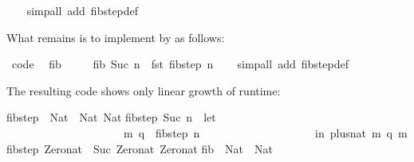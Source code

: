 \begin{isabellebody}
\ \ \isamarkupfalse%
\ {\isacharparenleft}simp{\isacharunderscore}all\ add{\isacharcolon}\ fib{\isacharunderscore}step{\isacharunderscore}def{\isacharparenright}%
\endisatagquote
{\isafoldquote}%
%
\isadelimquote
%
\endisadelimquote
%
\begin{isamarkuptext}%
\noindent What remains is to implement  by  as follows:%
\end{isamarkuptext}%
\isamarkuptrue%
%
\isadelimquote
%
\endisadelimquote
%
\isatagquote
{}\isamarkupfalse%
\ {\isacharbrackleft}code{\isacharbrackright}{\isacharcolon}\isanewline
\ \ {\isachardoublequoteopen}fib\ {}\ {\isacharequal}\ {}{\isachardoublequoteclose}\isanewline
\ \ {\isachardoublequoteopen}fib\ {\isacharparenleft}Suc\ n{\isacharparenright}\ {\isacharequal}\ fst\ {\isacharparenleft}fib{\isacharunderscore}step\ n{\isacharparenright}{\isachardoublequoteclose}\isanewline
\ \ \isamarkupfalse%
\ {\isacharparenleft}simp{\isacharunderscore}all\ add{\isacharcolon}\ fib{\isacharunderscore}step{\isacharunderscore}def{\isacharparenright}%
\endisatagquote
{\isafoldquote}%
%
\isadelimquote
%
\endisadelimquote
%
\begin{isamarkuptext}%
\noindent The resulting code shows only linear growth of runtime:%
\end{isamarkuptext}%
\isamarkuptrue%
%
\isadelimquote
%
\endisadelimquote
%
\isatagquote
%
\begin{isamarkuptext}%
\begin{typewriter}
    fib{\isacharunderscore}step\ {\isacharcolon}{\isacharcolon}\ Nat\ {\isacharminus}{\isachargreater}\ {\isacharparenleft}Nat{\isacharcomma}\ Nat{\isacharparenright}{\isacharsemicolon}\isanewline
fib{\isacharunderscore}step\ {\isacharparenleft}Suc\ n{\isacharparenright}\ {\isacharequal}\ let\ {\isacharbraceleft}\isanewline
\ \ \ \ \ \ \ \ \ \ \ \ \ \ \ \ \ \ \ \ \ {\isacharparenleft}m{\isacharcomma}\ q{\isacharparenright}\ {\isacharequal}\ fib{\isacharunderscore}step\ n{\isacharsemicolon}\isanewline
\ \ \ \ \ \ \ \ \ \ \ \ \ \ \ \ \ \ \ {\isacharbraceright}\ in\ {\isacharparenleft}plus{\isacharunderscore}nat\ m\ q{\isacharcomma}\ m{\isacharparenright}{\isacharsemicolon}\isanewline
fib{\isacharunderscore}step\ Zero{\isacharunderscore}nat\ {\isacharequal}\ {\isacharparenleft}Suc\ Zero{\isacharunderscore}nat{\isacharcomma}\ Zero{\isacharunderscore}nat{\isacharparenright}{\isacharsemicolon}\isanewline
\isanewline
fib\ {\isacharcolon}{\isacharcolon}\ Nat\ {\isacharminus}{\isachargreater}\ Nat{\isacharsemicolon}\isanewline

\end{typewriter}
\end{isamarkuptext}
\end{isabellebody}
